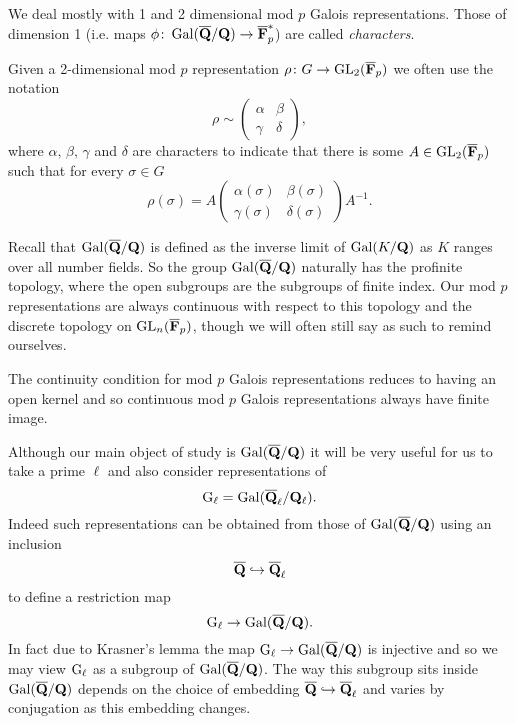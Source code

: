\documentclass[a4paper,12pt]{article}
\begin{document}
We deal mostly with 1 and 2 dimensional mod $p$ Galois representations.
Those of dimension 1 (i.e. maps $\phi\colon\operatorname{Gal}(\overline{\mathbf{Q}}/\mathbf{Q}) \to \overline{\mathbf{F}}_p^*$) are called \emph{characters}.

Given a 2-dimensional mod $p$ representation $\rho\colon G\to \operatorname{GL}_2(\overline{\mathbf{F}}_p)$ we often use the notation
\[
\rho \sim \begin{pmatrix}
\alpha & \beta \\
\gamma & \delta
\end{pmatrix},
\]
where $\alpha,\,\beta,\,\gamma$ and $\delta$ are characters to indicate that there is some $A\in\operatorname{GL}_2(\overline{\mathbf{F}}_p)$ such that for every $\sigma\in G$
\[
\rho(\sigma) = A
 \begin{pmatrix}
\alpha(\sigma) & \beta(\sigma) \\
\gamma(\sigma) & \delta(\sigma)
\end{pmatrix}A^{-1}.
\]

Recall that $\operatorname{Gal}(\overline{\mathbf{Q}}/\mathbf{Q})$ is defined as the inverse limit of $\operatorname{Gal}(K/\mathbf{Q})$ as $K$ ranges over all number fields.
So the group $\operatorname{Gal}(\overline{\mathbf{Q}}/\mathbf{Q})$ naturally has the profinite topology, where the open subgroups are the subgroups of finite index.
Our mod $p$ representations are always continuous with respect to this topology and the discrete topology on $\operatorname{GL}_n(\overline{\mathbf{F}}_p)$, though we will often still say as such to remind ourselves.

\begin{rmk}\label{rmk:ctsfin}
The continuity condition for mod $p$ Galois representations reduces to having an open kernel and so continuous mod $p$ Galois representations always have finite image.
\end{rmk}

Although our main object of study is $\operatorname{Gal}(\overline{\mathbf{Q}}/\mathbf{Q})$ it will be very useful for us to take a prime $\ell$ and also consider representations of
\[
\mathrm{G}_\ell = \operatorname{Gal}(\overline{\mathbf{Q}}_\ell/\mathbf{Q}_\ell).
\]
Indeed such representations can be obtained from those of $\operatorname{Gal}(\overline{\mathbf{Q}}/\mathbf{Q})$ using an inclusion
\[
\overline{\mathbf{Q}} \hookrightarrow \overline{\mathbf{Q}}_\ell
\]
to define a restriction map
\[
\mathrm{G}_\ell \to \operatorname{Gal}(\overline{\mathbf{Q}}/\mathbf{Q}).
\]
In fact due to Krasner's lemma \cite[p. 238]{Cohen} the map $\mathrm{G}_\ell \to \operatorname{Gal}(\overline{\mathbf{Q}}/\mathbf{Q})$ is injective and so we may view $\mathrm{G}_\ell$ as a subgroup of $\operatorname{Gal}(\overline{\mathbf{Q}}/\mathbf{Q})$.
The way this subgroup sits inside $\operatorname{Gal}(\overline{\mathbf{Q}}/\mathbf{Q})$ depends on the choice of embedding $\overline{\mathbf{Q}} \hookrightarrow \overline{\mathbf{Q}}_\ell$ and varies by conjugation as this embedding changes.
\end{document}
